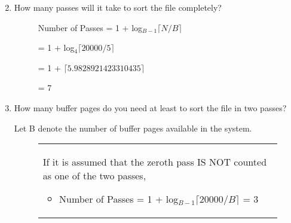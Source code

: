\documentclass[10pt]{article}
\begin{document}
\begin{enumerate}
\begin{figure}[!htb]
\begin{minipage}{0.8\textwidth}
\begin{table}[H]
{\begin{tabular}{|P{2cm}|P{40mm}|P{4cm}|}
							\end{tabular}
						}
					\end{table}
				\end{minipage}
			\end{figure}
			
				
			
					
			\item How many passes will it take to sort the file completely?
				
				\begin{figure}[!htb]
					\centering
					\begin{minipage}{0.34\textwidth}
						\centering
					\end{minipage}%

					\begin{minipage}{0.45\textwidth}
						Number of Passes = 1 + log$_{B-1}$$ \lceil {N} / {B} \rceil$ 
						
						\hspace{8em}= 1 + log$_{4}$$ \lceil {20000} / {5} \rceil$
						
						\hspace{8em}= 1 + $\lceil 5.9828921423310435 \rceil$
						
						\hspace{8em}= 7
					\end{minipage}					
					
					
					\begin{minipage}{0.2\textwidth}
						\centering
					\end{minipage}
				\end{figure}
				
				
			
			\item How many buffer pages do you need at least to sort the file in two passes?
			
				Let B denote the number of buffer pages available in the system.
				
				\begin{figure}[!htb]
					\centering
					\begin{minipage}{0.5\textwidth}
						\begin{tabular}{p{}}
							If it is assumed that the zeroth pass IS NOT
							 counted as one of the two passes,
							
							\begin{itemize}
								\item Number of Passes = 1 + log$_{B-1} \lceil {20000} / {B} \rceil$ = 3
								

\end{itemize}
\end{tabular}
\end{minipage}
\end{figure}
\end{enumerate}
\end{document}
